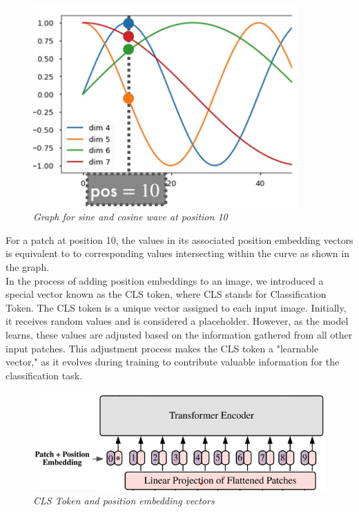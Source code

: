 \begin{figure}[htbp]
    \centering
    \includegraphics[width=4in]{img/pos 10.png}
    \caption{\textit{Graph for sine and cosine wave  at position 10}}
\end{figure}
For a patch at position 10, the values in its associated position embedding vectors is equivalent to to corresponding values intersecting within the curve as shown in the graph.\\

In the process of adding position embeddings to an image, we introduced a special vector known as the CLS token, where CLS stands for Classification Token. The CLS token is a unique vector assigned to each input image. Initially, it receives random values and is considered a placeholder. However, as the model learns, these values are adjusted based on the information gathered from all other input patches. This adjustment process makes the CLS token a "learnable vector," as it evolves during training to contribute valuable information for the classification task.

\begin{figure}[htbp]
    \centering
    \includegraphics[width=5in]{img/CLS token.png}
    \caption{\textit{CLS Token and position embedding vectors}}
\end{figure}

